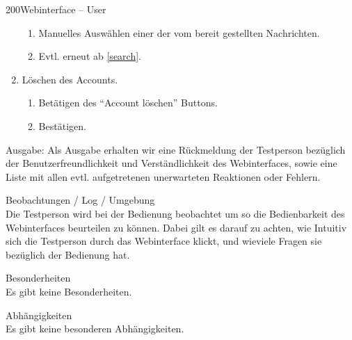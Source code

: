 \begin{testcase}{200}{Webinterface -- User}
\begin{enumerate}
\begin{enumerate}
    \item Manuelles Auswählen einer der vom \NewsGenie bereit gestellten Nachrichten.
		\item Evtl. erneut ab \ref{search}.
	\end{enumerate}
  \item Löschen des Accounts.
	\begin{enumerate}
	  \item Betätigen des "`Account löschen"' Buttons.
	  \item Bestätigen.
  \end{enumerate}
\end{enumerate}
Ausgabe:
Als Ausgabe erhalten wir eine Rückmeldung der Testperson bezüglich der Benutzerfreundlichkeit und Verständlichkeit
des Webinterfaces, sowie eine Liste mit allen evtl. aufgetretenen unerwarteten Reaktionen oder Fehlern.
\item[Beobachtungen / Log / Umgebung]~\\
Die Testperson wird bei der Bedienung beobachtet um so die Bedienbarkeit des Webinterfaces beurteilen zu können.
Dabei gilt es darauf zu achten, wie Intuitiv sich die Testperson durch das Webinterface klickt, und wieviele Fragen 
sie bezüglich der Bedienung hat.
\item[Besonderheiten]~\\
Es gibt keine Besonderheiten.
\item[Abhängigkeiten]~\\
Es gibt keine besonderen Abhängigkeiten.
\end{testcase}

